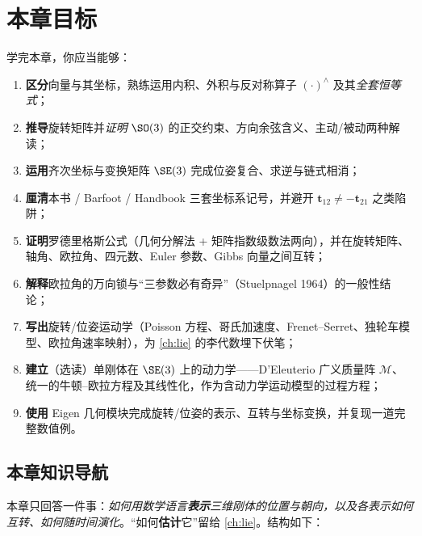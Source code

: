 \section*{本章目标}
学完本章，你应当能够：
\begin{enumerate}
  \item \textbf{区分}向量与其坐标，熟练运用内积、外积与反对称算子 $(\cdot)^\wedge$ 及其\emph{全套恒等式}；
  \item \textbf{推导}旋转矩阵并\emph{证明} $\SO(3)$ 的正交约束、方向余弦含义、主动/被动两种解读；
  \item \textbf{运用}齐次坐标与变换矩阵 $\SE(3)$ 完成位姿复合、求逆与链式相消；
  \item \textbf{厘清}本书 / Barfoot / Handbook 三套坐标系记号，并避开 $\mathbf{t}_{12}\neq-\mathbf{t}_{21}$ 之类陷阱；
  \item \textbf{证明}罗德里格斯公式（几何分解法 + 矩阵指数级数法两向），并在旋转矩阵、轴角、欧拉角、四元数、Euler 参数、Gibbs 向量之间互转；
  \item \textbf{解释}欧拉角的万向锁与“三参数必有奇异”（Stuelpnagel 1964）的一般性结论；
  \item \textbf{写出}旋转/位姿运动学（Poisson 方程、哥氏加速度、Frenet--Serret、独轮车模型、欧拉角速率映射），为 \cref{ch:lie} 的李代数埋下伏笔；
  \item \textbf{建立}（选读）单刚体在 $\SE(3)$ 上的动力学——D'Eleuterio 广义质量阵 $\boldsymbol{\mathcal{M}}$、统一的牛顿--欧拉方程及其线性化，作为含动力学运动模型的过程方程；
  \item \textbf{使用} Eigen 几何模块完成旋转/位姿的表示、互转与坐标变换，并复现一道完整数值例。
\end{enumerate}

\subsection*{本章知识导航}
本章只回答一件事：\emph{如何用数学语言\textbf{表示}三维刚体的位置与朝向，以及各表示如何互转、如何随时间演化}。“如何\textbf{估计}它”留给 \cref{ch:lie}。结构如下：

